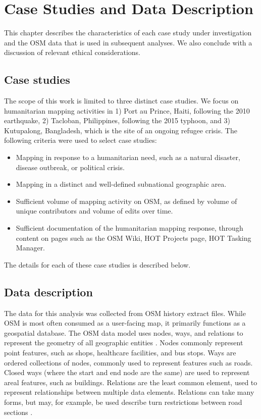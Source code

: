 \chapter{Case Studies and Data Description}
\label{chapterlabel3}

This chapter describes the characteristics of each case study under investigation and the OSM data that is used in subsequent analyses. We also conclude with a discussion of relevant ethical considerations. 

\section{Case studies}

The scope of this work is limited to three distinct case studies. We focus on humanitarian mapping activities in 1) Port au Prince, Haiti, following the 2010 earthquake, 2) Tacloban, Philippines, following the 2015 typhoon, and 3) Kutupalong, Bangladesh, which is the site of an ongoing refugee crisis. The following criteria were used to select case studies: 

\begin{itemize}
    \item Mapping in response to a humanitarian need, such as a natural disaster, disease outbreak, or political crisis.
    \item Mapping in a distinct and well-defined subnational geographic area.
	\item Sufficient volume of mapping activity on OSM, as defined by volume of unique contributors and volume of edits over time. 
    \item Sufficient documentation of the humanitarian mapping response, through content on pages such as the OSM Wiki, HOT Projects page, HOT Tasking Manager. 
\end{itemize}

The details for each of these case studies is described below. 


\section{Data description}

The data for this analysis was collected from OSM history extract files. While OSM is most often consumed as a user-facing map, it primarily functions as a geospatial database. The OSM data model uses nodes, ways, and relations to represent the geometry of all geographic entities \parencite{noauthor_elements_nodate}. Nodes commonly represent point features, such as shops, healthcare facilities, and bus stops. Ways are ordered collections of nodes, commonly used to represent features such as roads. Closed ways (where the start and end node are the same) are used to represent areal features, such as buildings. Relations are the least common element, used to represent relationships between multiple data elements. Relations can take many forms, but may, for example, be used describe turn restrictions between road sections \parencite{noauthor_elements_nodate}. 

